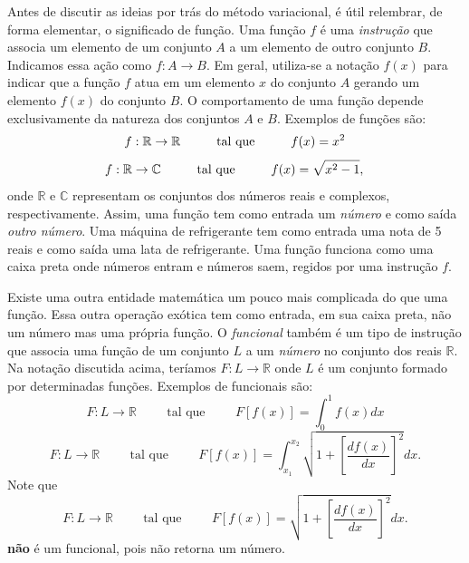 \documentclass{article}
\begin{document}
Antes de discutir as ideias por trás do método variacional, é útil relembrar, de forma elementar, o significado de função. Uma função $f$ é uma \textit{instrução} que associa um elemento de um conjunto $A$ a um elemento de outro conjunto $B$. Indicamos essa ação como $f: A \rightarrow B$. Em geral, utiliza-se a notação $f(x)$ para indicar que a função $f$ atua em um elemento $x$ do conjunto $A$ gerando um elemento $f(x)$ do conjunto $B$. O comportamento de uma função depende exclusivamente da natureza dos conjuntos $A$ e $B$. Exemplos de funções são:
\begin{equation}
    f:\mathbb{R}\rightarrow\mathbb{R}\hspace{1cm} \text{tal que} \hspace{1cm} f(x) = x^2 \\
\end{equation}
\begin{equation}
    f:\mathbb{R}\rightarrow\mathbb{C}\hspace{1cm} \text{tal que} \hspace{1cm} f(x) = \sqrt{x^2-1}, \\
\end{equation}
onde $\mathbb{R}$ e $\mathbb{C}$ representam os conjuntos dos números reais e complexos, respectivamente. Assim, uma função tem como entrada um \textit{número} e como saída \textit{outro número}. Uma máquina de refrigerante tem como entrada uma nota de 5 reais e como saída uma lata de refrigerante. Uma função funciona como uma caixa preta onde números entram e números saem, regidos por uma instrução $f$.

Existe uma outra entidade matemática um pouco mais complicada do que uma função. Essa outra operação exótica tem como entrada, em sua caixa preta, não um número mas uma própria função. O \textit{funcional} também é um tipo de instrução que associa uma função de um conjunto $L$ a um \textit{número} no conjunto dos reais $\mathbb{R}$. Na notação discutida acima, teríamos $F:L\rightarrow\mathbb{R}$ onde $L$ é um conjunto formado por determinadas funções. Exemplos de funcionais são:
\begin{equation}
    F:L\rightarrow\mathbb{R}\hspace{1cm} \text{tal que} \hspace{1cm} F[f(x)] = \int_{0}^{1}f(x)dx
\end{equation}
\begin{equation}
    F:L\rightarrow\mathbb{R}\hspace{1cm} \text{tal que} \hspace{1cm} F[f(x)] = \int_{x_1}^{x_2}\sqrt{1+\left[\frac{df(x)}{dx}\right]^2}dx. 
\end{equation}
Note que 
\begin{equation}
    F:L\rightarrow\mathbb{R}\hspace{1cm} \text{tal que} \hspace{1cm} F[f(x)] = \sqrt{1+\left[\frac{df(x)}{dx}\right]^2}dx. 
\end{equation}
\textbf{não} é um funcional, pois não retorna um número.
\end{document}
